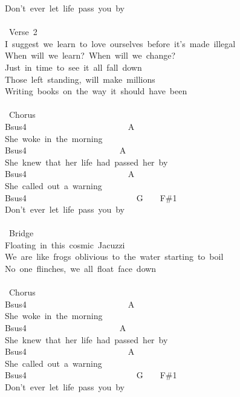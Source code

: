 {Don't\ ever\ let\ life\ pass\ you\ by\\
\\
\lbrack\ Verse\ 2\rbrack\\
I\ suggest\ we\ learn\ to\ love\ ourselves\ before\ it's\ made\ illegal\\
When\ will\ we\ learn?\ When\ will\ we\ change?\\
Just\ in\ time\ to\ see\ it\ all\ fall\ down\\
Those\ left\ standing,\ will\ make\ millions\\
Writing\ books\ on\ the\ way\ it\ should\ have\ been\\
\\
\lbrack\ Chorus\rbrack\\
Bsus4\ \ \ \ \ \ \ \ \ \ \ \ \ \ \ \ \ \ \ \ \ \ \ \ A\\
She\ woke\ in\ the\ morning\\
Bsus4\ \ \ \ \ \ \ \ \ \ \ \ \ \ \ \ \ \ \ \ \ \ A\\
She\ knew\ that\ her\ life\ had\ passed\ her\ by\\
Bsus4\ \ \ \ \ \ \ \ \ \ \ \ \ \ \ \ \ \ \ \ \ \ \ \ A\\
She\ called\ out\ a\ warning\\
Bsus4\ \ \ \ \ \ \ \ \ \ \ \ \ \ \ \ \ \ \ \ \ \ \ \ \ \ G\ \ \ \ F\#1\\
Don't\ ever\ let\ life\ pass\ you\ by\\
\\
\lbrack\ Bridge\rbrack\\
Floating\ in\ this\ cosmic\ Jacuzzi\\
We\ are\ like\ frogs\ oblivious\ to\ the\ water\ starting\ to\ boil\\
No\ one\ flinches,\ we\ all\ float\ face\ down\\
\\
\lbrack\ Chorus\rbrack\\
Bsus4\ \ \ \ \ \ \ \ \ \ \ \ \ \ \ \ \ \ \ \ \ \ \ \ A\\
She\ woke\ in\ the\ morning\\
Bsus4\ \ \ \ \ \ \ \ \ \ \ \ \ \ \ \ \ \ \ \ \ \ A\\
She\ knew\ that\ her\ life\ had\ passed\ her\ by\\
Bsus4\ \ \ \ \ \ \ \ \ \ \ \ \ \ \ \ \ \ \ \ \ \ \ \ A\\
She\ called\ out\ a\ warning\\
Bsus4\ \ \ \ \ \ \ \ \ \ \ \ \ \ \ \ \ \ \ \ \ \ \ \ \ \ G\ \ \ \ F\#1\\
Don't\ ever\ let\ life\ pass\ you\ by\ }

